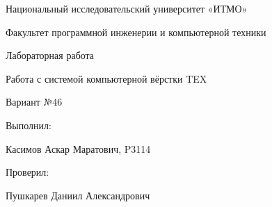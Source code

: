 \documentclass[a4paper,12pt]{article}
\begin{document}
\begin{center}
    \par\large Национальный исследовательский университет «ИТМО»\\
    \vspace*{\baselineskip}
    \par\large Факультет программной инженерии и компьютерной техники\\
\end{center}

\vfill

\begin{center}
    \par\Large Лабораторная работа 
    \vspace*{\baselineskip}
    \par\large Работа с системой компьютерной вёрстки TEX \\ 
    \par\large Вариант №46 \\
\end{center}

\vfill

\begin{flushright}
    \par\large Выполнил: \\
    \par\large Касимов Аскар Маратович, P3114
    \par\large Проверил: \\
    \par\large Пушкарев Даниил Александрович
\end{flushright}

\vfill
\end{document}
